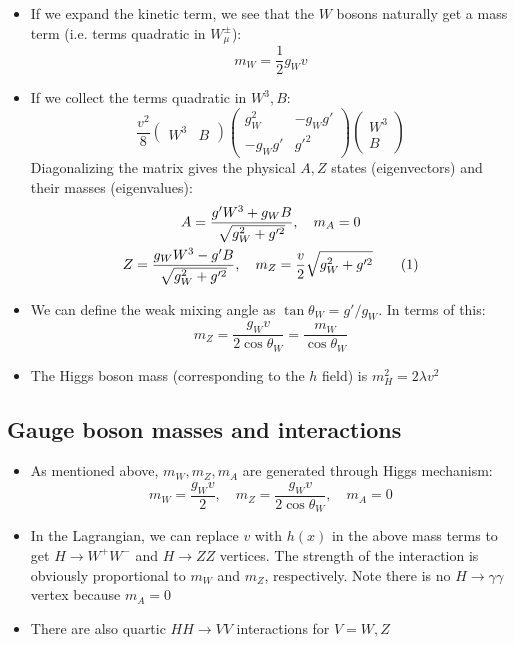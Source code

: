 \begin{itemize}
\begin{equation}
   \end{equation}
   \item If we expand the kinetic term, we see that the $W$ bosons naturally get a mass term (i.e. terms quadratic in $W_\mu^\pm$):
   \begin{equation}
     m_W = \frac{1}{2} g_W v
   \end{equation}
   \item If we collect the terms quadratic in $W^3,B$:
   \begin{equation}
     \frac{v^2}{8} \begin{pmatrix} W^3 & B \end{pmatrix} \begin{pmatrix} g_W^2 & - g_W g' \\ -g_W g' & g'^2 \end{pmatrix} \begin{pmatrix} W^3 \\ B \end{pmatrix}
   \end{equation}
   Diagonalizing the matrix gives the physical $A,Z$ states (eigenvectors) and their masses (eigenvalues):
   \begin{gather*}
    A = \frac{g' W^3 + g_W B}{\sqrt{g_W^2 + g'^2}}, \quad m_A = 0\\
    Z = \frac{g_W W^3 - g' B}{\sqrt{g_W^2 + g'^2}}, \quad m_Z = \frac{v}{2}\sqrt{g_W^2+g'^2}\numberthis
   \end{gather*}
   \item We can define the weak mixing angle as $\tan\theta_W = g'/g_W$. In terms of this:
   \begin{equation}
     m_Z = \frac{g_Wv}{2\cos\theta_W} = \frac{m_W}{\cos\theta_W}
   \end{equation}
   \item The Higgs boson mass (corresponding to the $h$ field) is $m_H^2 =2\lambda v^2$
\end{itemize}

\subsection{Gauge boson masses and interactions}
\begin{itemize}
  \item As mentioned above, $m_W,m_Z,m_A$ are generated through Higgs mechanism:
  \begin{equation}
    m_W = \frac{g_W v}{2}, \quad m_Z = \frac{g_W v}{2\cos\theta_W}, \quad m_A = 0
  \end{equation}
  \item In the Lagrangian, we can replace $v$ with $h(x)$ in the above mass terms to get $H\rightarrow W^+ W^-$ and $H\rightarrow ZZ$ vertices. The strength of the interaction is obviously proportional to $m_W$ and $m_Z$, respectively. Note there is no $H\rightarrow \gamma\gamma$ vertex because $m_A = 0$
  \item There are also quartic $HH\rightarrow VV$ interactions for $V=W,Z$
\end{itemize}

